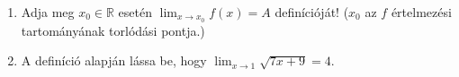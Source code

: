 \documentclass[11pt]{scrartcl}
\begin{document}
\begin{enumerate}
	\item Adja meg $x_0 \in \mathbb{R}$ esetén $\lim_{x \to x_0} f(x) = A$
	      definícióját! ($x_0$ az $f$ értelmezési tartományának torlódási
	      pontja.)

	\item A definíció alapján lássa be, hogy
	      $\lim_{x \to 1} \sqrt{7x + 9} = 4$.
\end{enumerate}
\end{document}
